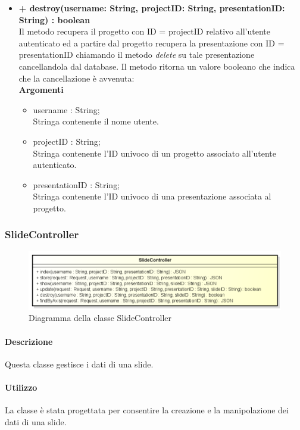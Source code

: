 \begin{itemize}
			\item \textbf{+ destroy(username: String, projectID: String, presentationID: String) : boolean}\\
			Il metodo recupera il progetto con ID = projectID relativo all'utente autenticato ed a partire dal progetto recupera la presentazione con ID = presentationID chiamando il metodo \textit{delete} su tale presentazione cancellandola dal database. Il metodo ritorna un valore booleano che indica che la cancellazione è avvenuta:\\
			\textbf{Argomenti}
			\begin{itemize}
				\item username : String; \\
				Stringa contenente il nome utente.
				\item projectID : String; \\
				Stringa contenente l'ID univoco di un progetto associato all'utente autenticato.
				\item presentationID : String; \\
				Stringa contenente l'ID univoco di una presentazione associata al progetto.
			\end{itemize}
		\end{itemize}
		
\newpage
\subsubsection{SlideController}
\begin{figure}[h]
\centering
\includegraphics[width=0.8\linewidth]{img/back_end_http_controllers_slideController}
\caption[Diagramma della classe SlideController]{Diagramma della classe SlideController}
\label{fig:back_end_http_controllers_slideController}
\end{figure}

	\paragraph{Descrizione}
		Questa classe gestisce i dati di una slide.
	\paragraph{Utilizzo}
		La classe è stata progettata per consentire la creazione e la manipolazione dei dati di una slide.

